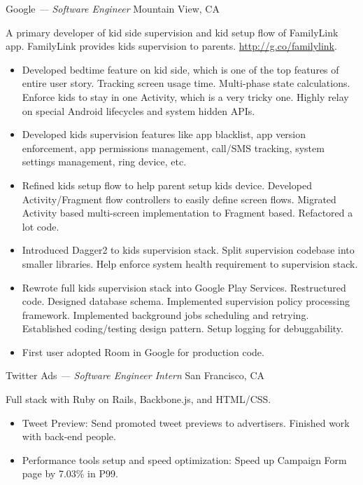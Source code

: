 \documentclass[]{friggeri-cv} %
\begin{document}
\begin{entrylist}
  {Google \emph{--- Software Engineer}}
  {Mountain View, CA}
  {
    A primary developer of kid side supervision and kid setup flow of FamilyLink app.
    FamilyLink provides kids supervision to parents.
    \url{http://g.co/familylink}.
    \begin{itemize}
      \item Developed bedtime feature on kid side, which is one of the top features of entire user story.
      Tracking screen usage time. Multi-phase state calculations.
      Enforce kids to stay in one Activity, which is a very tricky one.
      Highly relay on special Android lifecycles and system hidden APIs.
      \item Developed kids supervision features like app blacklist, app version enforcement, app permissions management, call/SMS tracking, system settings management, ring device, etc.
      \item Refined kids setup flow to help parent setup kids device.
      Developed Activity/Fragment flow controllers to easily define screen flows.
      Migrated Activity based multi-screen implementation to Fragment based.
      Refactored a lot code.
      \item Introduced Dagger2 to kids supervision stack. Split supervision codebase into smaller libraries.
      Help enforce system health requirement to supervision stack.
      \item Rewrote full kids supervision stack into Google Play Services.
      Restructured code. Designed database schema. Implemented supervision policy processing framework.
      Implemented background jobs scheduling and retrying.
      Established coding/testing design pattern.
      Setup logging for debuggability.
      \item First user adopted Room in Google for production code.
    \end{itemize}
  }
  {Twitter Ads \emph{--- Software Engineer Intern}}
  {San Francisco, CA}
  {
    Full stack with Ruby on Rails, Backbone.js, and HTML/CSS.\@
    \begin{itemize}
      \item Tweet Preview: Send promoted tweet previews to advertisers. Finished work with back-end people.
      \item Performance tools setup and speed optimization: Speed up Campaign Form page by 7.03\% in P99.

\end{itemize}}
\end{entrylist}
\end{document}

